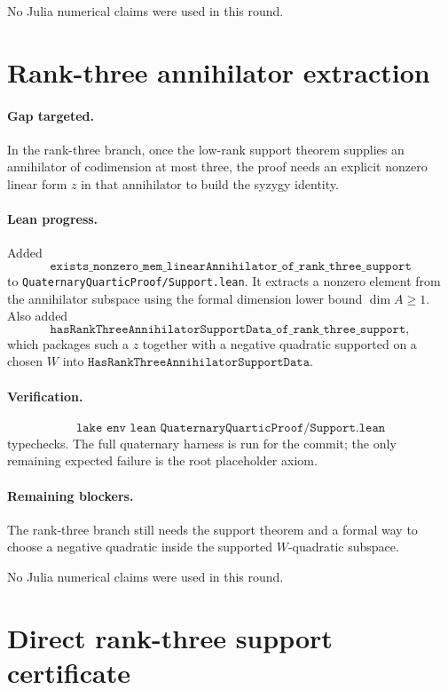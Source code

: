 \documentclass[11pt]{article}
\begin{document}
No Julia numerical claims were used in this round.

\section*{Rank-three annihilator extraction}

\paragraph{Gap targeted.}
In the rank-three branch, once the low-rank support theorem supplies an
annihilator of codimension at most three, the proof needs an explicit nonzero
linear form \(z\) in that annihilator to build the syzygy identity.

\paragraph{Lean progress.}
Added
\[
\texttt{exists\_nonzero\_mem\_linearAnnihilator\_of\_rank\_three\_support}
\]
to \texttt{QuaternaryQuarticProof/Support.lean}.  It extracts a nonzero
element from the annihilator subspace using the formal dimension lower bound
\(\dim A\ge1\).  Also added
\[
\texttt{hasRankThreeAnnihilatorSupportData\_of\_rank\_three\_support},
\]
which packages such a \(z\) together with a negative quadratic supported on a
chosen \(W\) into \(\texttt{HasRankThreeAnnihilatorSupportData}\).

\paragraph{Verification.}
\[
\texttt{lake env lean QuaternaryQuarticProof/Support.lean}
\]
typechecks.  The full quaternary harness is run for the commit; the only
remaining expected failure is the root placeholder axiom.

\paragraph{Remaining blockers.}
The rank-three branch still needs the support theorem and a formal way to
choose a negative quadratic inside the supported \(W\)-quadratic subspace.

No Julia numerical claims were used in this round.

\section*{Direct rank-three support certificate}
\end{document}

